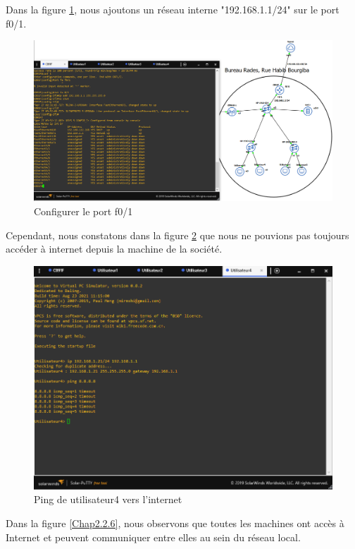 Dans la figure \ref{Chap2.2.4}, nous ajoutons un réseau interne "192.168.1.1/24" sur le port f0/1. 

\begin{figure}[H]
 \centering
    \includegraphics[width=16cm]{Images/BRades-Topologie4.png}
    \caption{Configurer le port f0/1}
    \label{Chap2.2.4}
\end{figure}

Cependant, nous constatons dans la figure \ref{Chap2.2.5} que nous ne pouvions pas toujours accéder à internet depuis la machine de la société.

\begin{figure}[H]
 \centering
    \includegraphics[width=16cm]{Images/BRades-Topologie5.png}
    \caption{Ping de utilisateur4 vers l'internet}
    \label{Chap2.2.5}
\end{figure}


Dans la figure \ref{Chap2.2.6}, nous observons que toutes les machines ont accès à Internet et peuvent communiquer entre elles au sein du réseau local.


